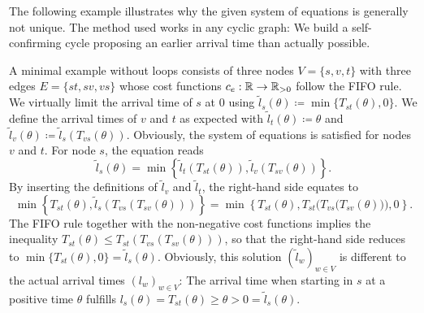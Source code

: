 The following example illustrates why the given system of equations is generally not unique.
The method used works in any cyclic graph: We build a self-confirming cycle proposing an earlier arrival time than actually possible.
\begin{example}
    A minimal example without loops consists of three nodes $V=\{ s, v, t \}$ with three edges $E=\{ st, sv, vs \}$ whose cost functions $c_e: \mathbb{R} \rightarrow \mathbb{R}_{>0}$ follow the FIFO rule.
    We virtually limit the arrival time of $s$ at $0$ using $\tilde l_s (\theta) \coloneqq \min\{ T_{st}(\theta), 0 \}$.
    We define the arrival times of $v$ and $t$ as expected with $\tilde l_t(\theta) \coloneqq \theta$ and $\tilde l_v(\theta) \coloneqq \tilde l_s(T_{vs}(\theta))$.
    Obviously, the system of equations is satisfied for nodes $v$ and $t$.
    For node $s$, the equation reads \[
        \tilde l_s(\theta) = \min\left\{ \tilde l_t(T_{st}(\theta)), \tilde l_v(T_{sv}(\theta)) \right\}. 
    \]
    By inserting the definitions of $\tilde l_v$ and $\tilde l_t$, the right-hand side equates to \[
        \min\left\{ T_{st}(\theta), \tilde l_s(T_{vs}(T_{sv}(\theta))) \right\}
        = \min \left\{ T_{st}(\theta), T_{st} \Big( T_{vs}\big(T_{sv}(\theta)\big) \Big), 0 \right\}.
    \]
    The FIFO rule together with the non-negative cost functions implies the inequality $T_{st}(\theta) \leq T_{st} ( T_{vs}(T_{sv}(\theta)))$, so that the right-hand side reduces to $\min\{ T_{st}(\theta), 0 \} = \tilde l_s(\theta)$.
    Obviously, this solution $(\tilde l_w)_{w\in V}$ is different to the actual arrival times $(l_w)_{w\in V}$: The arrival time when starting in $s$ at a positive time $\theta$ fulfills $l_s(\theta) = T_{st}(\theta) \geq \theta > 0 = \tilde l_s(\theta)$.
\end{example}